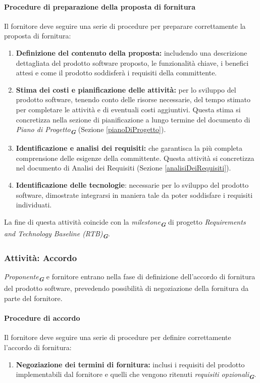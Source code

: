\documentclass[a4paper,12pt]{article}
\newcommand{\glossario}[1]{\textit{#1}\textsubscript{\textbf{\textit{\textcolor{lightblack}{G}}}}}
\begin{document}
\paragraph{Procedure di preparazione della proposta di fornitura}
Il fornitore deve seguire una serie di procedure per preparare correttamente la proposta di fornitura:
\begin{enumerate}
    \item \textbf{Definizione del contenuto della proposta:}  includendo una descrizione dettagliata del prodotto software proposto, le funzionalità chiave, i benefici attesi e come il prodotto soddisferà i requisiti della committente.
    \item \textbf{Stima dei costi e pianificazione delle attività:} per lo sviluppo del prodotto software, tenendo conto delle risorse necessarie, del tempo stimato per completare le attività e di eventuali costi aggiuntivi. Questa stima si concretizza nella sezione di pianificazione a lungo termine del documento di \glossario{Piano di Progetto} (Sezione \ref{pianoDiProgetto}).
    \item \textbf{Identificazione e analisi dei requisiti:} che garantisca la più completa comprensione delle esigenze della committente. Questa attività si concretizza nel documento di Analisi dei Requisiti (Sezione \ref{analisiDeiRequisiti}).
    \item \textbf{Identificazione delle tecnologie}: necessarie per lo sviluppo del prodotto software, dimostrate integrarsi in maniera tale da poter soddisfare i requisiti individuati.
\end{enumerate}
La fine di questa attività coincide con la \glossario{milestone} di progetto \glossario{Requirements and Technology Baseline (RTB)}.
\subsubsection{Attività: Accordo}
\glossario{Proponente} e fornitore entrano nella fase di definizione dell'accordo di
fornitura del prodotto software, prevedendo possibilità di negoziazione della
fornitura da parte del fornitore.
\paragraph{Procedure di accordo}
Il fornitore deve seguire una serie di procedure per definire correttamente l'accordo di fornitura:
\begin{enumerate}
    \item \textbf{Negoziazione dei termini di fornitura:} inclusi i requisiti del prodotto implementabili dal fornitore e quelli che vengono ritenuti \glossario{requisiti opzionali}.
\end{enumerate}
\end{document}
